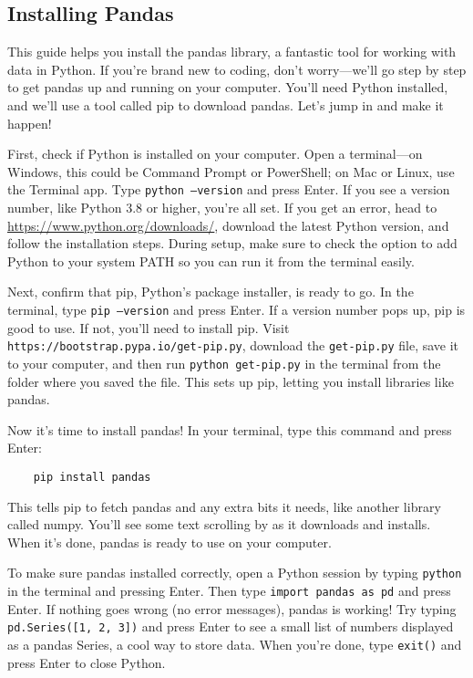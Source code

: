 \subsection{Installing Pandas}
This guide helps you install the pandas library, a fantastic tool for working with data in Python. If you're brand new to coding, don't worry—we'll go step by step to get pandas up and running on your computer. You'll need Python installed, and we'll use a tool called pip to download pandas. Let's jump in and make it happen!

First, check if Python is installed on your computer. Open a terminal—on Windows, this could be Command Prompt or PowerShell; on Mac or Linux, use the Terminal app. Type \texttt{python --version} and press Enter. If you see a version number, like Python 3.8 or higher, you're all set. If you get an error, head to \url{https://www.python.org/downloads/}, download the latest Python version, and follow the installation steps. During setup, make sure to check the option to add Python to your system PATH so you can run it from the terminal easily.

Next, confirm that pip, Python's package installer, is ready to go. In the terminal, type \texttt{pip --version} and press Enter. If a version number pops up, pip is good to use. If not, you’ll need to install pip. Visit \texttt{https://bootstrap.pypa.io/get-pip.py}, download the \texttt{get-pip.py} file, save it to your computer, and then run \texttt{python get-pip.py} in the terminal from the folder where you saved the file. This sets up pip, letting you install libraries like pandas.

Now it’s time to install pandas! In your terminal, type this command and press Enter:
\begin{verbatim}
	pip install pandas
\end{verbatim}
This tells pip to fetch pandas and any extra bits it needs, like another library called numpy. You’ll see some text scrolling by as it downloads and installs. When it’s done, pandas is ready to use on your computer.

To make sure pandas installed correctly, open a Python session by typing \texttt{python} in the terminal and pressing Enter. Then type \texttt{import pandas as pd} and press Enter. If nothing goes wrong (no error messages), pandas is working! Try typing \texttt{pd.Series([1, 2, 3])} and press Enter to see a small list of numbers displayed as a pandas Series, a cool way to store data. When you’re done, type \texttt{exit()} and press Enter to close Python.

